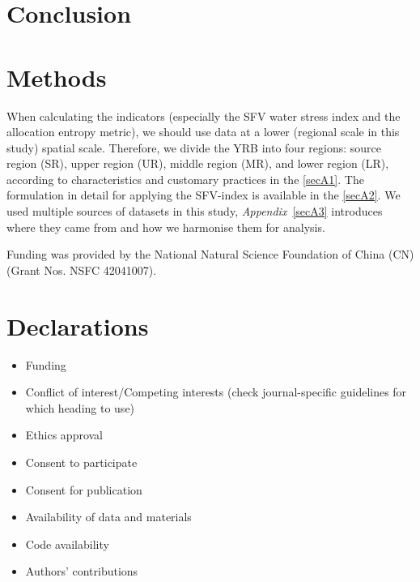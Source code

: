 \documentclass[default, sn-standardnature]{sn-jnl}%
\theoremstyle{thmstyleone}%
\theoremstyle{thmstyletwo}%
\theoremstyle{thmstylethree}%
\begin{document}
\section{Conclusion}\label{sec13}


\section{Methods}\label{sec11}


\backmatter

When calculating the indicators (especially the SFV water stress index and the allocation entropy metric), we should use data at a lower (regional scale in this study) spatial scale. Therefore, we divide the YRB into four regions: source region (SR), upper region (UR), middle region (MR), and lower region (LR), according to characteristics and customary practices in the \ref{secA1}.
The formulation in detail for applying the SFV-index is available in the \ref{secA2}.
We used multiple sources of datasets in this study, \textit{Appendix}~\ref{secA3} introduces where they came from and how we harmonise them for analysis.


Funding was provided by the National Natural Science Foundation of China (CN) (Grant Nos. NSFC 42041007).


\section*{Declarations}


\begin{itemize}
\item Funding
\item Conflict of interest/Competing interests (check journal-specific guidelines for which heading to use)
\item Ethics approval
\item Consent to participate
\item Consent for publication
\item Availability of data and materials
\item Code availability
\item Authors' contributions
\end{itemize}
\end{document}
